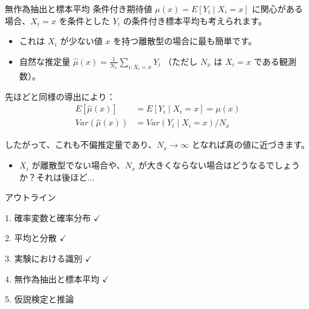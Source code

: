 \documentclass[11pt,handout]{beamer}
\begin{document}
\begin{frame}{無作為抽出と標本平均}
\vspace{0.2cm}
条件付き期待値 $\mu(x)=E[Y_i\mid X_i=x]$ に関心がある場合、$X_i=x$ を条件とした $Y_i$ の条件付き標本平均も考えられます。
\pause{}

\begin{itemize}
\item これは $X_i$ が少ない値 $x$ を持つ離散型の場合に最も簡単です。
\vspace{0.1cm}\pause{}
\item 自然な推定量 $\hat{\mu}(x)=\frac{1}{N_x}\sum_{i:X_i=x}Y_i$ （ただし $N_x$ は $X_i=x$ である観測数）。
\end{itemize}
\vspace{0.4cm}
\pause{}

先ほどと同様の導出により：
\begin{align*}
E[\hat{\mu}(x)]&=E[Y_i\mid X_i=x]=\mu(x)\\
Var(\hat{\mu}(x))&=Var(Y_i\mid X_i=x)/N_x
\end{align*}
\pause{}
\vspace{-0.2cm}

したがって、これも不偏推定量であり、$N_x\rightarrow\infty$ となれば真の値に近づきます。
\pause{}

\begin{itemize}
\item $X_i$ が離散型でない場合や、$N_x$ が大きくならない場合はどうなるでしょうか？それは後ほど...
\end{itemize}

\end{frame}

\begin{frame}{アウトライン}
	
	\textcolor{red!75!green!50!blue!25!gray}{1. 確率変数と確率分布} $\checkmark$
	\vspace{0.8cm}
	
	\textcolor{red!75!green!50!blue!25!gray}{2. 平均と分散} $\checkmark$
	\vspace{0.8cm}
	
	\textcolor{red!75!green!50!blue!25!gray}{3. 実験における識別} $\checkmark$
	\vspace{0.8cm}
	
	\textcolor{red!75!green!50!blue!25!gray}{4. 無作為抽出と標本平均} $\checkmark$
	
	\vspace{0.8cm}
	5. 仮説検定と推論 
	
\end{frame}
\end{document}
